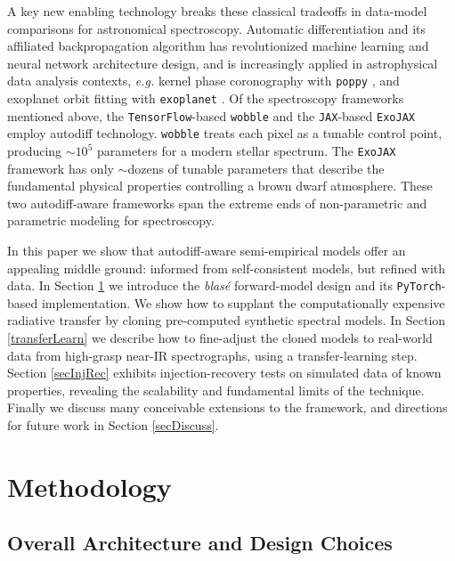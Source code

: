 \documentclass[modern]{aastex631}
\begin{document}
A key new enabling technology breaks these classical tradeoffs in data-model comparisons for astronomical spectroscopy.  Automatic differentiation \citep[``autodiff'',][]{2015arXiv150205767G} and its affiliated backpropagation algorithm has revolutionized machine learning and neural network architecture design, and is increasingly applied in astrophysical data analysis contexts, \emph{e.g.} kernel phase coronography with \texttt{poppy} \citep{2021ApJ...907...40P}, and exoplanet orbit fitting with \texttt{exoplanet} \citep{2021JOSS....6.3285F}.  Of the spectroscopy frameworks mentioned above, the \texttt{TensorFlow}-based \citep{tensorflow2015-whitepaper} \texttt{wobble} and the \texttt{JAX}-based \citep{jax2018github} \texttt{ExoJAX} employ autodiff technology.  \texttt{wobble} treats each pixel as a tunable control point, producing $\sim10^5$ parameters for a modern stellar spectrum.  The \texttt{ExoJAX} framework has only $\sim$dozens of tunable parameters that describe the fundamental physical properties controlling a brown dwarf atmosphere.  These two autodiff-aware frameworks span the extreme ends of non-parametric and parametric modeling for spectroscopy.

In this paper we show that autodiff-aware semi-empirical models offer an appealing middle ground: informed from self-consistent models, but refined with data.  In Section \ref{methodology} we introduce the \emph{blas\'e} forward-model design and its \texttt{PyTorch}-based \cite{2019arXiv191201703P} implementation.  We show how to supplant the computationally expensive radiative transfer by cloning pre-computed synthetic spectral models.  In Section \ref{transferLearn} we describe how to fine-adjust the cloned models to real-world data from high-grasp near-IR spectrographs, using a transfer-learning step.  Section \ref{secInjRec} exhibits injection-recovery tests on simulated data of known properties, revealing the scalability and fundamental limits of the technique.  Finally we discuss many conceivable extensions to the framework, and directions for future work in Section \ref{secDiscuss}.


\section{Methodology}\label{methodology}

\subsection{Overall Architecture and Design Choices}
\end{document}
